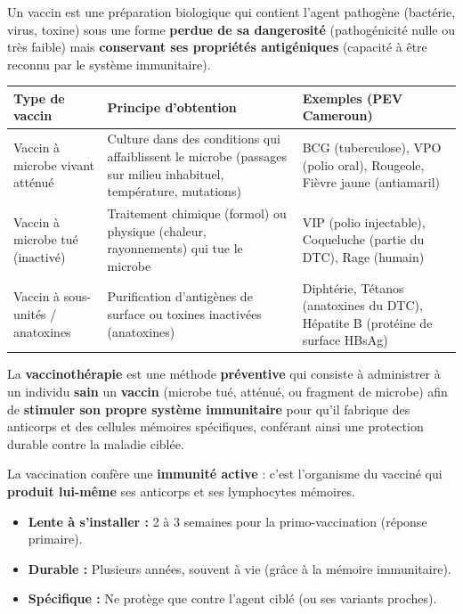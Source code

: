 \documentclass[11pt]{article}
\newcommand{\cle}[1]{{\popxbold\color{popdark}#1}}
\newcounter{popsec}
\newcounter{popsub}
\newcommand{\courssub}[1]{%
  \stepcounter{popsub}%
  \par\vspace{9pt}\noindent{\popxbold\fontsize{11.5}{13}\selectfont\color{popink}{\color{poporange}\thepopsec.\thepopsub}\hspace{6pt}#1}\par\nopagebreak\vspace{4pt}
}
\begin{document}
Un \cle{vaccin} est une préparation biologique qui contient l'agent pathogène (bactérie, virus, toxine) sous une forme \textbf{perdue de sa dangerosité} (pathogénicité nulle ou très faible) mais \textbf{conservant ses propriétés antigéniques} (capacité à être reconnu par le système immunitaire).

\begin{center}
\begin{tabularx}{\linewidth}{|l|X|X|}\hline
\rowcolor{popblueL}
\textbf{Type de vaccin} & \textbf{Principe d'obtention} & \textbf{Exemples (PEV Cameroun)} \\ \hline
\cle{Vaccin à microbe vivant atténué} & Culture dans des conditions qui affaiblissent le microbe (passages sur milieu inhabituel, température, mutations) & BCG (tuberculose), VPO (polio oral), Rougeole, Fièvre jaune (antiamaril) \\ \hline
\cle{Vaccin à microbe tué (inactivé)} & Traitement chimique (formol) ou physique (chaleur, rayonnements) qui tue le microbe & VIP (polio injectable), Coqueluche (partie du DTC), Rage (humain) \\ \hline
\cle{Vaccin à sous-unités / anatoxines} & Purification d'antigènes de surface ou toxines inactivées (anatoxines) & Diphtérie, Tétanos (anatoxines du DTC), Hépatite B (protéine de surface HBsAg) \\ \hline
\end{tabularx}
\end{center}

\courssub{Définition et principe}

\begin{definition}[Vaccinothérapie]
La \textbf{vaccinothérapie} est une méthode \textbf{préventive} qui consiste à administrer à un individu \textbf{sain} un \textbf{vaccin} (microbe tué, atténué, ou fragment de microbe) afin de \textbf{stimuler son propre système immunitaire} pour qu'il fabrique des anticorps et des cellules mémoires spécifiques, conférant ainsi une protection durable contre la maladie ciblée.
\end{definition}

\begin{propriete}
La vaccination confère une \textbf{immunité active} : c'est l'organisme du vacciné qui \textbf{produit lui-même} ses anticorps et ses lymphocytes mémoires.
\begin{itemize}
    \item \textbf{Lente à s'installer :} 2 à 3 semaines pour la primo-vaccination (réponse primaire).
    \item \textbf{Durable :} Plusieurs années, souvent à vie (grâce à la mémoire immunitaire).
    \item \textbf{Spécifique :} Ne protège que contre l'agent ciblé (ou ses variants proches).
\end{itemize}
\end{propriete}
\end{document}
